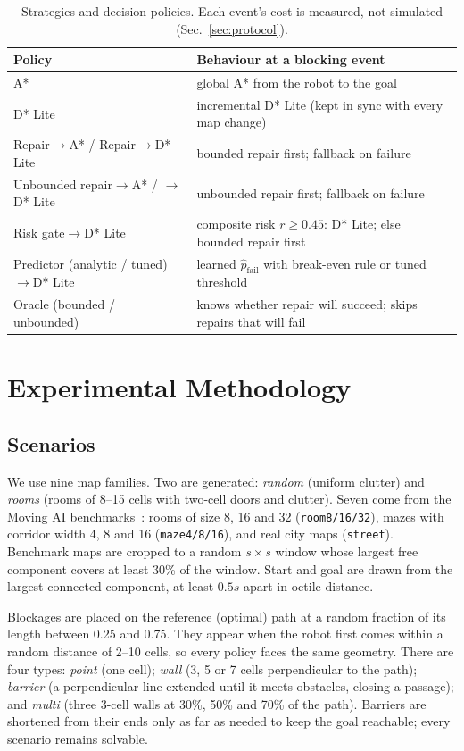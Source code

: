 \documentclass[11pt,a4paper]{article}
\begin{document}
\begin{table}[t]
\centering\small
\caption{Strategies and decision policies. Each event's cost is measured, not simulated (Sec.~\ref{sec:protocol}).}
\label{tab:policies}
\begin{tabular}{@{}ll@{}}
\toprule
Policy & Behaviour at a blocking event \\
\midrule
A* & global A* from the robot to the goal \\
D* Lite & incremental D* Lite (kept in sync with every map change) \\
Repair$\to$A* / Repair$\to$D* Lite & bounded repair first; fallback on failure \\
Unbounded repair$\to$A* / $\to$D* Lite & unbounded repair first; fallback on failure \\
Risk gate$\to$D* Lite & composite risk $r\ge0.45$: D* Lite; else bounded repair first \\
Predictor (analytic / tuned)$\to$D* Lite & learned $\hat p_{\text{fail}}$ with break-even rule or tuned threshold \\
Oracle (bounded / unbounded) & knows whether repair will succeed; skips repairs that will fail \\
\bottomrule
\end{tabular}
\end{table}

\section{Experimental Methodology}\label{sec:method}
\subsection{Scenarios}
We use nine map families. Two are generated: \emph{random} (uniform clutter) and \emph{rooms} (rooms of 8--15 cells with two-cell doors and clutter). Seven come from the Moving AI benchmarks~\cite{sturtevant2012}: rooms of size 8, 16 and 32 (\texttt{room8/16/32}), mazes with corridor width 4, 8 and 16 (\texttt{maze4/8/16}), and real city maps (\texttt{street}). Benchmark maps are cropped to a random $s\times s$ window whose largest free component covers at least 30\% of the window. Start and goal are drawn from the largest connected component, at least $0.5s$ apart in octile distance.

Blockages are placed on the reference (optimal) path at a random fraction of its length between 0.25 and 0.75. They appear when the robot first comes within a random distance of 2--10 cells, so every policy faces the same geometry. There are four types: \emph{point} (one cell); \emph{wall} (3, 5 or 7 cells perpendicular to the path); \emph{barrier} (a perpendicular line extended until it meets obstacles, closing a passage); and \emph{multi} (three 3-cell walls at 30\%, 50\% and 70\% of the path). Barriers are shortened from their ends only as far as needed to keep the goal reachable; every scenario remains solvable.
\end{document}
